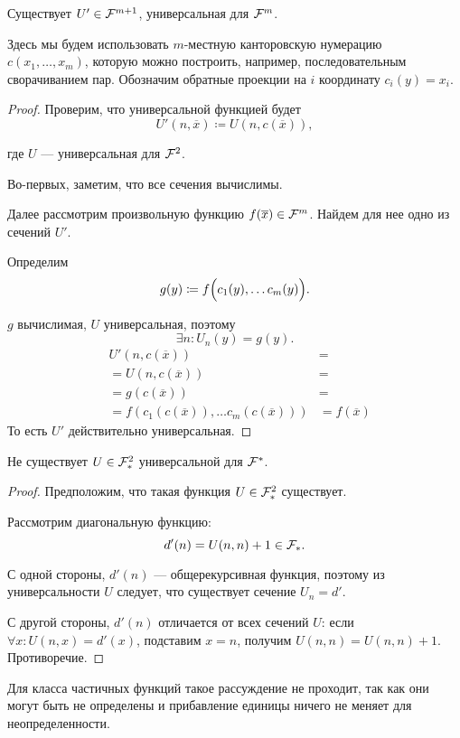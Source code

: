 \begin{cor}\label{cor:3}
    Существует $ U' \in  \mathcal{F}^{m+1}$, универсальная для $ \mathcal{F}^{m}$.
\end{cor}
\begin{note}
    Здесь мы будем использовать $ m$-местную канторовскую нумерацию $ c(x_1, \ldots , x_m)$, которую можно построить, например, последовательным сворачиванием пар.
	Обозначим обратные проекции на $ i$ координату $ c_i(y) = x_i$.
\end{note}
\begin{proof}
	Проверим, что универсальной функцией будет
	\[
		U'(n, \overline{x}) \coloneqq U(n, c(\overline{x}))
	,\] 

	где $ U$ --- универсальная для $ \mathcal{F}^{2}$.

	Во-первых, заметим, что все сечения вычислимы. 

	Далее рассмотрим произвольную функцию $ f(\overline{x}) \in \mathcal{F}^{m}$. Найдем для нее одно из сечений $ U'$.

	Определим 
	\[
		g(y)\coloneqq f\Bigl(c_1(y), \ldots c_m(y)\Bigr)
	.\] 

	$ g$ вычислимая, $ U$ универсальная, поэтому 
	\[
		\exists n \colon  U_n(y) = g(y)
	.\] 
	\begin{align*}
		& U'(n, c(\overline{x})) &=  \tag{по определению  $U$} \\
		&=U(n, c(\overline{x})) &= \tag{$ n$ -- номер $g$} \\
		&=g(c(\overline{x})) &= \tag{по определению $g$} \\
		&= f(c_1(c(\overline{x})), \ldots c_{m}(c(\overline{x})))&= f(\overline{x})
	\end{align*}
	То есть $ U'$ действительно универсальная.
\end{proof}


\begin{thm}
    Не существует $ U \in \mathcal{F}_{*}^{2}$ универсальной для $ \mathcal{F}^{*}$.
\end{thm}
\begin{proof}
    Предположим, что такая функция $ U \in  \mathcal{F}_{*}^{2}$ существует.

	Рассмотрим диагональную функцию:
	\[
		d'(n) = U(n, n) + 1 \in \mathcal{F}_{*}
	.\] 

	С одной стороны, $ d'(n) $  --- общерекурсивная функция, поэтому из универсальности $ U$ следует, что существует сечение $ U_n = d'$.

	С другой стороны, $d'(n)$ отличается от всех сечений $ U$: 
	если $ \forall x \colon U(n, x) = d'(x)$, подставим $ x = n $, получим $U(n, n) = U(n, n ) + 1$. Противоречие. 
\end{proof}
\begin{note}
    Для класса частичных функций такое рассуждение не проходит, так как они могут быть не определены и прибавление единицы ничего не меняет для неопределенности.
\end{note}

